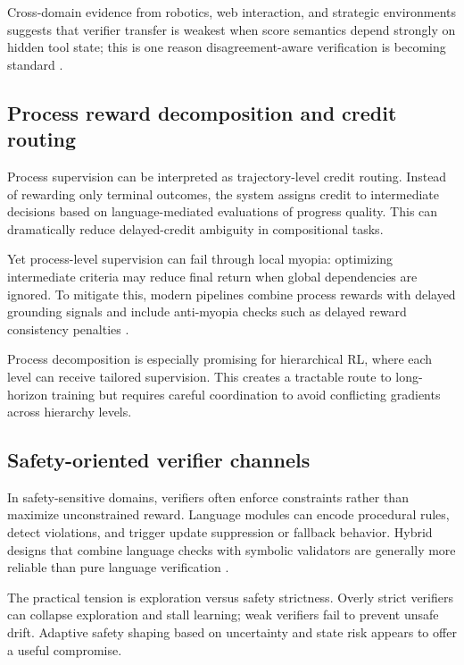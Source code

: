 \documentclass[pdflatex,sn-mathphys-num]{sn-jnl}
\begin{document}
Cross-domain evidence from robotics, web interaction, and strategic environments suggests that verifier transfer is weakest when score semantics depend strongly on hidden tool state; this is one reason disagreement-aware verification is becoming standard \cite{arxiv_p_2404_03648,arxiv_p_2601_02439,arxiv_p_2602_14234}.

\subsection{Process reward decomposition and credit routing}
Process supervision can be interpreted as trajectory-level credit routing. Instead of rewarding only terminal outcomes, the system assigns credit to intermediate decisions based on language-mediated evaluations of progress quality. This can dramatically reduce delayed-credit ambiguity in compositional tasks.

Yet process-level supervision can fail through local myopia: optimizing intermediate criteria may reduce final return when global dependencies are ignored. To mitigate this, modern pipelines combine process rewards with delayed grounding signals and include anti-myopia checks such as delayed reward consistency penalties \cite{arxiv_p_2510_20867,doi_p_10_48448_0js4_fm43,arxiv_p_2602_11551}.

Process decomposition is especially promising for hierarchical RL, where each level can receive tailored supervision. This creates a tractable route to long-horizon training but requires careful coordination to avoid conflicting gradients across hierarchy levels.

\subsection{Safety-oriented verifier channels}
In safety-sensitive domains, verifiers often enforce constraints rather than maximize unconstrained reward. Language modules can encode procedural rules, detect violations, and trigger update suppression or fallback behavior. Hybrid designs that combine language checks with symbolic validators are generally more reliable than pure language verification \cite{arxiv_p_2512_05686,arxiv_p_2602_09367,arxiv_p_2602_13156}.

The practical tension is exploration versus safety strictness. Overly strict verifiers can collapse exploration and stall learning; weak verifiers fail to prevent unsafe drift. Adaptive safety shaping based on uncertainty and state risk appears to offer a useful compromise.
\end{document}
